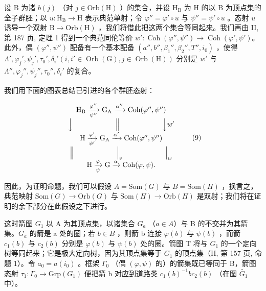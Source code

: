 设 B 为诸 \(b(j)\) （对 \(j \in \mathrm{Orb}(\mathrm{H})\) ）的集合，并设 \(\mathrm{H}_{\mathrm{B}}\) 为 H 的以 B 为顶点集的全子群胚；以 \(u: \mathrm{H}_{\mathrm{B}} \to \mathrm{H}\) 表示典范单射；令 \(\varphi'' = \varphi' \circ u\) 与 \(\psi'' = \psi' \circ u\) 。态射 \(u\) 诱导一个双射 \(\mathrm{B} \to \mathrm{Orb}(\mathrm{H})\) ，我们将借此把这两个集合等同起来。我们再由 II, 第 187 页, 定理 1 得到一个典范同伦等价 \(w': \operatorname{Coh}(\varphi'', \psi'') \to \operatorname{Coh}(\varphi', \psi')\)。此外，偶 \((\varphi'', \psi'')\) 配备有一个基本配备 \((a'', b'', \beta_1'', \beta_2'', T'', i_0)\) ，使得 \(\Lambda', \varphi_j', \psi_j', \tau_0', \delta_i' (i, i' \in \operatorname{Orb}(\mathrm{G}), j \in \operatorname{Orb}(\mathrm{H}))\) 分别是 \(w'\) 与 \(\Lambda'', \varphi_j'', \psi_j'', \tau_0'', \delta_i'\) 的复合。

我们用下面的图表总结已引进的各个群胚态射：

\[
\begin{array}{c} \mathrm {H_ {B}} \xrightarrow [ \psi^ {\prime \prime} ]{\varphi^ {\prime \prime}} \mathrm {G_ {A}} \xrightarrow {\alpha^ {\prime \prime}} \mathrm{Coh} (\varphi^ {\prime \prime}, \psi^ {\prime \prime}) \\ \Big \downarrow \qquad \qquad \qquad \Big \| \qquad \qquad \qquad \Big \downarrow w ^ {\prime} \\ \mathrm{H} \xrightarrow [ \psi^ {\prime} ]{\varphi^ {\prime}} \mathrm {G_ {A}} \xrightarrow {\alpha^ {\prime}} \mathrm{Coh} (\varphi^ {\prime \prime}, \psi^ {\prime \prime}) \\ \Big \| \qquad \qquad \qquad \Big | _ {v} \qquad \qquad \qquad \Big | _ {w} \\ \mathrm{H} \xrightarrow [ \psi ]{\varphi} \mathrm{G} \xrightarrow {\alpha} \mathrm{Coh} (\varphi , \psi)  . \end{array}\tag{9}
\]

因此，为证明命题，我们可以假设 \(A = \text{Som}(G)\) 与 \(B = \text{Som}(H)\) ，换言之，典范映射 \(\text{Som}(G) \to \text{Orb}(G)\) 与 \(\text{Som}(H) \to \text{Orb}(H)\) 是双射；我们将在证明的余下部分在此假设之下进行。

这时箭图 \(G_{1}\) 以 A 为其顶点集，以诸集合 \(G_{a}\) （\(a \in A\)）与 B 的不交并为其箭集。\(G_{a}\) 的箭是 a 处的圈；若 \(b \in B\) ，则箭 b 连接 \(\varphi(b)\) 与 \(\psi(b)\) ，而箭 \(c_{1}(b)\) 与 \(c_{2}(b)\) 分别是 \(\varphi(b)\) 与 \(\psi(b)\) 处的圈。箭图 T 将与 \(G_{1}\) 的一个定向树等同起来；它是极大定向树，因为其顶点集等于 \(G_{1}\) 的顶点集（II, 第 157 页, 命题 1）。令 \(a_{0} = a(i_{0})\) 。框架 \(\Gamma_{0}\) （偶 \((\varphi, \psi)\) 的）的箭集既已等同于 B，箭图态射 \(\tau_{1}: \Gamma_{0} \to \text{Grp}(G_{1})\) 便把箭 b 对应到道路类 \(c_{1}(b)^{-1}bc_{2}(b)\) （在图 \(\widetilde{G_{1}}\) 中）。

